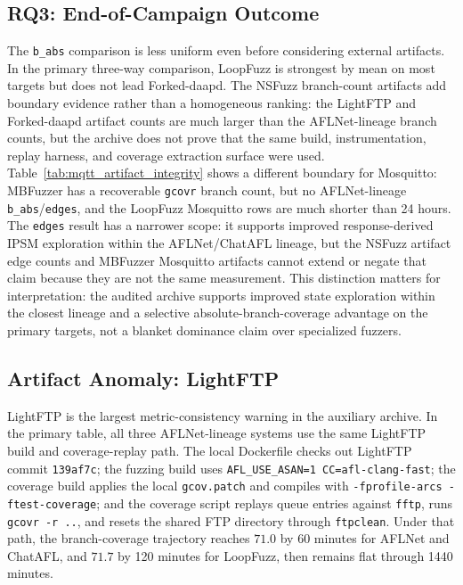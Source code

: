 \documentclass[final,5p,times,number]{elsarticle}
\begin{document}
\subsection{RQ3: End-of-Campaign Outcome}

The \texttt{b\_abs} comparison is less uniform even before considering external artifacts. In the primary three-way comparison, LoopFuzz is strongest by mean on most targets but does not lead Forked-daapd. The NSFuzz branch-count artifacts add boundary evidence rather than a homogeneous ranking: the LightFTP and Forked-daapd artifact counts are much larger than the AFLNet-lineage branch counts, but the archive does not prove that the same build, instrumentation, replay harness, and coverage extraction surface were used. Table~\ref{tab:mqtt_artifact_integrity} shows a different boundary for Mosquitto: MBFuzzer has a recoverable \texttt{gcovr} branch count, but no AFLNet-lineage \texttt{b\_abs}/\texttt{edges}, and the LoopFuzz Mosquitto rows are much shorter than 24 hours. The \texttt{edges} result has a narrower scope: it supports improved response-derived IPSM exploration within the AFLNet/ChatAFL lineage, but the NSFuzz artifact edge counts and MBFuzzer Mosquitto artifacts cannot extend or negate that claim because they are not the same measurement. This distinction matters for interpretation: the audited archive supports improved state exploration within the closest lineage and a selective absolute-branch-coverage advantage on the primary targets, not a blanket dominance claim over specialized fuzzers.

\subsection{Artifact Anomaly: LightFTP}
\label{sec:lightftp_anomaly}

LightFTP is the largest metric-consistency warning in the auxiliary archive. In the primary table, all three AFLNet-lineage systems use the same LightFTP build and coverage-replay path. The local Dockerfile checks out LightFTP commit \texttt{139af7c}; the fuzzing build uses \texttt{AFL\_USE\_ASAN=1 CC=afl-clang-fast}; the coverage build applies the local \texttt{gcov.patch} and compiles with \texttt{-fprofile-arcs -ftest-coverage}; and the coverage script replays queue entries against \texttt{fftp}, runs \texttt{gcovr -r ..}, and resets the shared FTP directory through \texttt{ftpclean}. Under that path, the branch-coverage trajectory reaches $71.0$ by 60 minutes for AFLNet and ChatAFL, and $71.7$ by 120 minutes for LoopFuzz, then remains flat through 1440 minutes.
\end{document}
